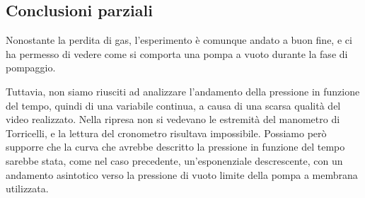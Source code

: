 \subsection{Conclusioni parziali}

Nonostante la perdita di gas, l'esperimento è comunque andato a buon fine, e ci ha permesso di vedere come si comporta
una pompa a vuoto durante la fase di pompaggio.

Tuttavia, non siamo riusciti ad analizzare l'andamento della pressione in funzione del tempo, quindi di una variabile continua, a causa di una scarsa qualità del video realizzato. Nella ripresa non si vedevano le estremità del manometro di Torricelli, e la lettura del cronometro risultava impossibile. Possiamo però supporre che la curva che avrebbe descritto la pressione in funzione del tempo sarebbe stata, come nel caso precedente, un'esponenziale descrescente, con un andamento asintotico verso la pressione di vuoto limite della pompa a membrana utilizzata.
